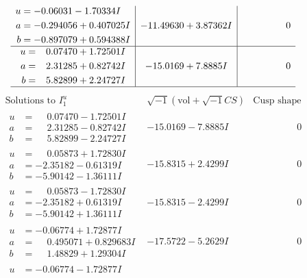 \documentclass[1p]{elsarticle_modified}
\theoremstyle{definition}
\newcommand{\I}{\sqrt{-1}}
\begin{document}
$$\begin{array}{c|c|c}
\begin{aligned}
u &= -0.06031 - 1.70334 I \\
a &= -0.294056 + 0.407025 I \\
b &= -0.897079 + 0.594388 I\end{aligned}
 & -11.49630 + 3.87362 I & \phantom{-0.000000 } 0 \\ \hline\begin{aligned}
u &= \phantom{-}0.07470 + 1.72501 I \\
a &= \phantom{-}2.31285 + 0.82742 I \\
b &= \phantom{-}5.82899 + 2.24727 I\end{aligned}
 & -15.0169 + 7.8885 I & \phantom{-0.000000 } 0\\
 \hline 
 \end{array}$$\newpage$$\begin{array}{c|c|c}  
\text{Solutions to }I^u_{1}& \I (\text{vol} + \sqrt{-1}CS) & \text{Cusp shape}\\
 \hline 
\begin{aligned}
u &= \phantom{-}0.07470 - 1.72501 I \\
a &= \phantom{-}2.31285 - 0.82742 I \\
b &= \phantom{-}5.82899 - 2.24727 I\end{aligned}
 & -15.0169 - 7.8885 I & \phantom{-0.000000 } 0 \\ \hline\begin{aligned}
u &= \phantom{-}0.05873 + 1.72830 I \\
a &= -2.35182 - 0.61319 I \\
b &= -5.90142 - 1.36111 I\end{aligned}
 & -15.8315 + 2.4299 I & \phantom{-0.000000 } 0 \\ \hline\begin{aligned}
u &= \phantom{-}0.05873 - 1.72830 I \\
a &= -2.35182 + 0.61319 I \\
b &= -5.90142 + 1.36111 I\end{aligned}
 & -15.8315 - 2.4299 I & \phantom{-0.000000 } 0 \\ \hline\begin{aligned}
u &= -0.06774 + 1.72877 I \\
a &= \phantom{-}0.495071 + 0.829683 I \\
b &= \phantom{-}1.48829 + 1.29304 I\end{aligned}
 & -17.5722 - 5.2629 I & \phantom{-0.000000 } 0 \\ \hline\begin{aligned}
u &= -0.06774 - 1.72877 I \\

\end{aligned}
\end{array}$$
\end{document}
